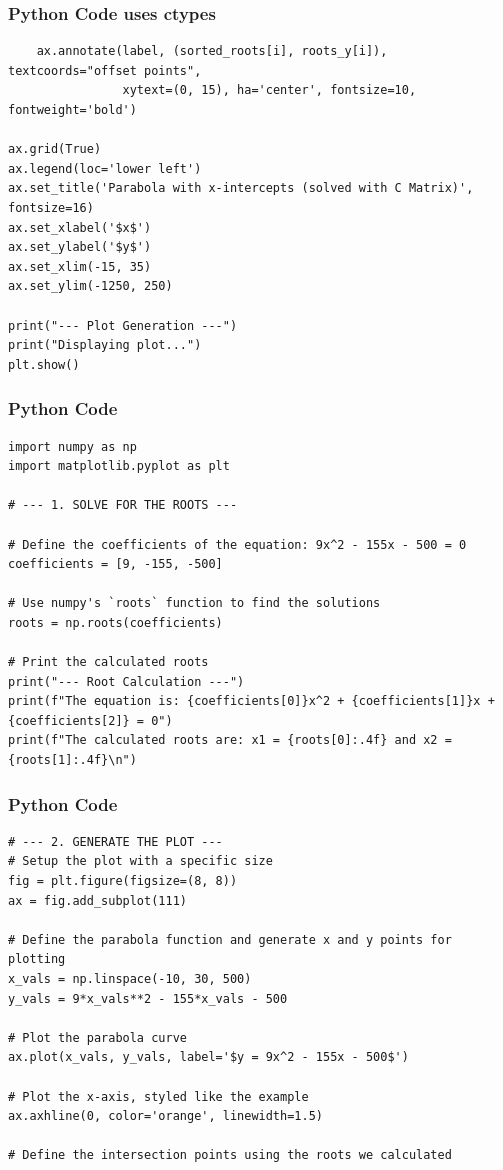 \documentclass{beamer}
\begin{document}
\begin{frame}[fragile]
\frametitle{Python Code uses ctypes}
\begin{lstlisting}
    ax.annotate(label, (sorted_roots[i], roots_y[i]), textcoords="offset points",
                xytext=(0, 15), ha='center', fontsize=10, fontweight='bold')

ax.grid(True)
ax.legend(loc='lower left')
ax.set_title('Parabola with x-intercepts (solved with C Matrix)', fontsize=16)
ax.set_xlabel('$x$')
ax.set_ylabel('$y$')
ax.set_xlim(-15, 35)
ax.set_ylim(-1250, 250)

print("--- Plot Generation ---")
print("Displaying plot...")
plt.show()
\end{lstlisting}
\end{frame}
\begin{frame}[fragile]
\frametitle{Python Code}
\begin{lstlisting}
import numpy as np
import matplotlib.pyplot as plt

# --- 1. SOLVE FOR THE ROOTS ---

# Define the coefficients of the equation: 9x^2 - 155x - 500 = 0
coefficients = [9, -155, -500]

# Use numpy's `roots` function to find the solutions
roots = np.roots(coefficients)

# Print the calculated roots
print("--- Root Calculation ---")
print(f"The equation is: {coefficients[0]}x^2 + {coefficients[1]}x + {coefficients[2]} = 0")
print(f"The calculated roots are: x1 = {roots[0]:.4f} and x2 = {roots[1]:.4f}\n")
\end{lstlisting}
\end{frame}
\begin{frame}[fragile]
\frametitle{Python Code}
\begin{lstlisting}
# --- 2. GENERATE THE PLOT ---
# Setup the plot with a specific size
fig = plt.figure(figsize=(8, 8))
ax = fig.add_subplot(111)

# Define the parabola function and generate x and y points for plotting
x_vals = np.linspace(-10, 30, 500)
y_vals = 9*x_vals**2 - 155*x_vals - 500

# Plot the parabola curve
ax.plot(x_vals, y_vals, label='$y = 9x^2 - 155x - 500$')

# Plot the x-axis, styled like the example
ax.axhline(0, color='orange', linewidth=1.5)

# Define the intersection points using the roots we calculated
\end{lstlisting}
\end{frame}
\end{document}

